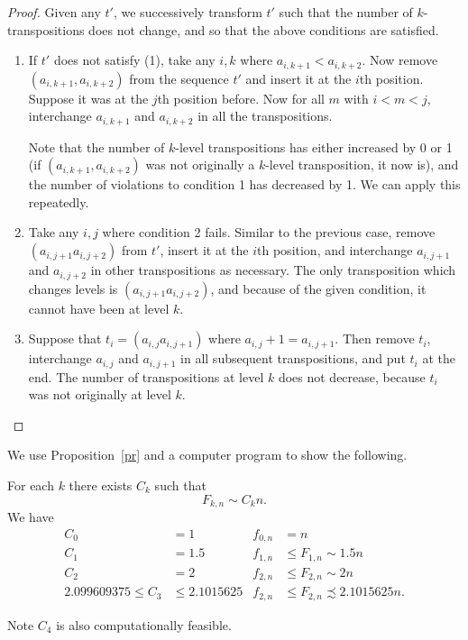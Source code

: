 \documentclass[12pt, reqno]{amsart}
\begin{document}
\begin{proof}
Given any $t'$, we successively transform $t'$ such that the number of $k$-transpositions does not change, and so that the above conditions are satisfied.

\begin{enumerate}
\item If $t'$ does not satisfy (1), take any $i,k$ where $a_{i,k+1}<a_{i,k+2}$. Now remove $(a_{i,k+1},a_{i,k+2})$ from the sequence $t'$ and insert it at the $i$th position. Suppose it was at the $j$th position before. Now for all $m$ with $i<m<j$, interchange $a_{i,k+1}$ and $a_{i,k+2}$ in all the transpositions.

Note that the number of $k$-level transpositions has either increased by 0 or 1 (if $(a_{i,k+1},a_{i,k+2})$ was not originally a $k$-level transposition, it now is), and the number of violations to condition 1 has decreased by 1. We can apply this repeatedly.
\item Take any $i,j$ where condition 2 fails. Similar to the previous case, remove $(a_{i,j+1}a_{i,j+2})$ from $t'$, insert it at the $i$th position, and interchange $a_{i,j+1}$ and $a_{i,j+2}$ in other transpositions as necessary. The only transposition which changes levels is $(a_{i,j+1}a_{i,j+2})$, and because of the given condition, it cannot have been at level $k$.
\item Suppose that $t_i=(a_{i,j}a_{i,j+1})$ where $a_{i,j}+1=a_{i,j+1}$. Then remove $t_i$, interchange $a_{i,j}$ and $a_{i,j+1}$ in all subsequent transpositions, and put $t_i$ at the end. The number of transpositions at level $k$ does not decrease, because $t_i$ was not originally at level $k$.
\end{enumerate}
\end{proof}

We use Proposition~\ref{pr} and a computer program to show the following.
\begin{thm}\label{thm}
For each $k$ there exists $C_k$ such that
\[
F_{k,n}\sim C_k n.
\]
We have
\begin{align*}
C_0&=1&f_{0,n}&=n\\
C_1&=1.5&f_{1,n}&\le F_{1,n}\sim 1.5n\\
C_2&=2&f_{2,n}&\le F_{2,n}\sim 2n\\
2.099609375\le C_3&\le 2.1015625& f_{2,n} &\le F_{2,n}\precsim 2.1015625n.
\end{align*}
\end{thm}
Note $C_4$ is also computationally feasible.
\end{document}
